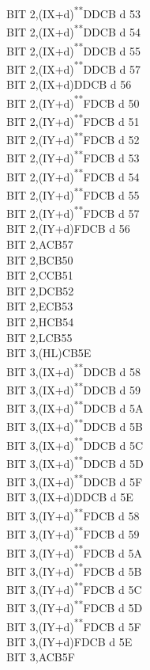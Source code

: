 \documentclass[twoside,openright,a4paper]{book}
\newcommand{\UNDOC}{\textnormal{\textsuperscript{**}}}
\begin{document}
\begin{multicols}{3}
{\begin{tabbing}
	BIT 2,(IX+d)\UNDOC\>DDCB d 53\\
	BIT 2,(IX+d)\UNDOC\>DDCB d 54\\
	BIT 2,(IX+d)\UNDOC\>DDCB d 55\\
	BIT 2,(IX+d)\UNDOC\>DDCB d 57\\
	BIT 2,(IX+d)\>DDCB d 56\\
	BIT 2,(IY+d)\UNDOC\>FDCB d 50\\
	BIT 2,(IY+d)\UNDOC\>FDCB d 51\\
	BIT 2,(IY+d)\UNDOC\>FDCB d 52\\
	BIT 2,(IY+d)\UNDOC\>FDCB d 53\\
	BIT 2,(IY+d)\UNDOC\>FDCB d 54\\
	BIT 2,(IY+d)\UNDOC\>FDCB d 55\\
	BIT 2,(IY+d)\UNDOC\>FDCB d 57\\
	BIT 2,(IY+d)\>FDCB d 56\\
	BIT 2,A\>CB57\\
	BIT 2,B\>CB50\\
	BIT 2,C\>CB51\\
	BIT 2,D\>CB52\\
	BIT 2,E\>CB53\\
	BIT 2,H\>CB54\\
	BIT 2,L\>CB55\\
	BIT 3,(HL)\>CB5E\\
	BIT 3,(IX+d)\UNDOC\>DDCB d 58\\
	BIT 3,(IX+d)\UNDOC\>DDCB d 59\\
	BIT 3,(IX+d)\UNDOC\>DDCB d 5A\\
	BIT 3,(IX+d)\UNDOC\>DDCB d 5B\\
	BIT 3,(IX+d)\UNDOC\>DDCB d 5C\\
	BIT 3,(IX+d)\UNDOC\>DDCB d 5D\\
	BIT 3,(IX+d)\UNDOC\>DDCB d 5F\\
	BIT 3,(IX+d)\>DDCB d 5E\\
	BIT 3,(IY+d)\UNDOC\>FDCB d 58\\
	BIT 3,(IY+d)\UNDOC\>FDCB d 59\\
	BIT 3,(IY+d)\UNDOC\>FDCB d 5A\\
	BIT 3,(IY+d)\UNDOC\>FDCB d 5B\\
	BIT 3,(IY+d)\UNDOC\>FDCB d 5C\\
	BIT 3,(IY+d)\UNDOC\>FDCB d 5D\\
	BIT 3,(IY+d)\UNDOC\>FDCB d 5F\\
	BIT 3,(IY+d)\>FDCB d 5E\\
	BIT 3,A\>CB5F\\

\end{tabbing}}
\end{multicols}
\end{document}
